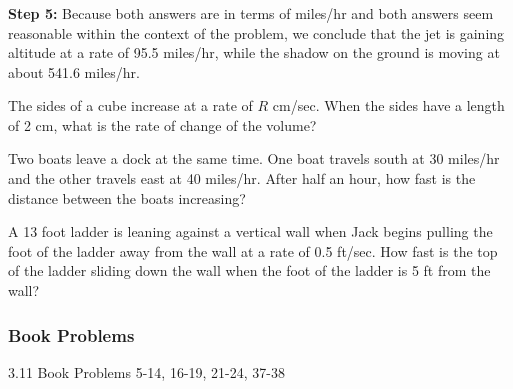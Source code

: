 \documentclass[cal1spr16Lectures.tex]{subfiles}
\begin{document}
\begin{frame}
\frametitle{}
{\bf Step 5:}  Because both answers are in terms of miles/hr and both answers seem reasonable within the context of the problem, we conclude that the jet is gaining altitude at a rate of 95.5 miles/hr, while the shadow on the ground is moving at about 541.6 miles/hr.
\end{frame}

\begin{frame}\small
\begin{ex} The sides of a cube increase at a rate of $R$ cm/sec.  When the sides have a length of 2 cm, what is the rate of change of the volume? \end{ex}

\begin{ex} Two boats leave a dock at the same time.  One boat travels south at 30 miles/hr and the other travels east at 40 miles/hr.  After half an hour, how fast is the distance between the boats increasing? \end{ex}
\end{frame}

\begin{frame}
\begin{exe}
A 13 foot ladder is leaning against a vertical wall when Jack begins pulling the foot of the ladder away from the wall at a rate of 0.5 ft/sec.  How fast is the top of the ladder sliding down the wall when the foot of the ladder is 5 ft from the wall?
\end{exe}
\end{frame}

\subsubsection{Book Problems}

\begin{frame}
\begin{block}{3.11 Book Problems}
5-14, 16-19, 21-24, 37-38
\end{block}
\end{frame}
\end{document}
